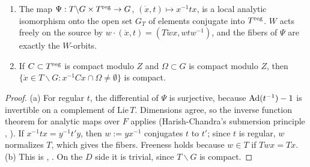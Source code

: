 \begin{lemma}\label{I:lem:Asub}\Ev
\begin{enumerate}[label=(\alph*)]
\item The map $\Psi:T\backslash G\times T^{\mathrm{reg}}\to G$, $(\dot x,t)\mapsto x^{-1}tx$, is a local analytic isomorphism onto the open set $G_T$ of elements conjugate into $T^{\mathrm{reg}}$. $W$ acts freely on the source by $w\cdot(\dot x,t)=(T\tilde wx,wtw^{-1})$, and the fibers of $\Psi$ are exactly the $W$-orbits.
\item If $C\subset T^{\mathrm{reg}}$ is compact modulo $Z$ and $\Omega\subset G$ is compact modulo $Z$, then $\{\dot x\in T\backslash G:x^{-1}Cx\cap\Omega\ne\emptyset\}$ is compact.
\end{enumerate}
\end{lemma}
\begin{proof}
(a) For regular $t$, the differential of $\Psi$ is surjective, because $\operatorname{Ad}(t^{-1})-1$ is invertible on a complement of $\mathrm{Lie}\,T$. Dimensions agree, so the inverse function theorem for analytic maps over $F$ applies (Harish-Chandra's submersion principle \cite{HC70}, \cite[\S\S7, 13]{Kot05}). If $x^{-1}tx=y^{-1}t'y$, then $w:=yx^{-1}$ conjugates $t$ to $t'$; since $t$ is regular, $w$ normalizes $T$, which gives the fibers. Freeness holds because $w\in T$ if $Twx=Tx$. (b) This is \cite[Chapter~\ref{ch:I}]{HC70}, \cite[\S13]{Kot05}. On the $D$ side it is trivial, since $T\backslash G$ is compact.
\end{proof}


